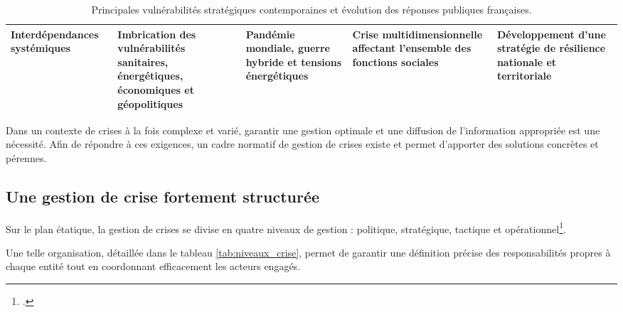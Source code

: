 \begin{table}[H]
\begin{tabularx}{\linewidth}{@{}
p{2.8cm}
Y
Y
Y
Y
@{}}
Interdépendances systémiques\footnotemark[\noteVulnerabilitesInterdependances] &
Imbrication des vulnérabilités sanitaires, énergétiques, économiques et géopolitiques &
Pandémie mondiale, guerre hybride et tensions énergétiques &
Crise multidimensionnelle affectant l'ensemble des fonctions sociales &
Développement d'une stratégie de résilience nationale et territoriale \\

\bottomrule
\end{tabularx}

\caption{Principales vulnérabilités stratégiques contemporaines et évolution des réponses publiques françaises.}
\label{tab:vulnerabilites_strategiques_thematique}
\end{table}


Dans un contexte de crises à la fois complexe et varié, garantir une gestion optimale et une diffusion de l'information appropriée est une nécessité. Afin de répondre à ces exigences, un cadre normatif de gestion de crises existe et permet d'apporter des solutions concrètes et pérennes.

\subsection{Une gestion de crise fortement structurée}

Sur le plan étatique, la gestion de crises se divise en quatre niveaux de gestion : politique, stratégique, tactique et opérationnel\footcite{niveaux_gestion_de_crise}.

Une telle organisation, détaillée dans le tableau \ref{tab:niveaux_crise}, permet de garantir une définition précise des responsabilités propres à chaque entité tout en coordonnant efficacement les acteurs engagés.

